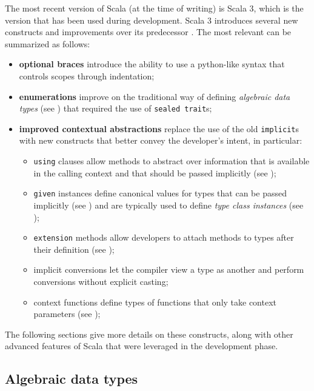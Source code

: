 The most recent version of Scala (at the time of writing) is Scala 3, which is the version that has been used during development.
%
Scala 3 introduces several new constructs and improvements over its predecessor \cite{new-in-scala-3}.
%
The most relevant can be summarized as follows:
%
\begin{itemize}
    \item \textbf{optional braces} introduce the ability to use a python-like syntax that controls scopes through indentation;
    \item \textbf{enumerations} improve on the traditional way of defining \textit{algebraic data types} (see ) that required the use of \texttt{sealed trait}s;
    \item \textbf{improved contextual abstractions} replace the use of the old \texttt{implicit}s with new constructs that better convey the developer's intent, in particular:
    \begin{itemize}
        \item \texttt{using} clauses allow methods to abstract over information that is available in the calling context and that should be passed implicitly (see );
        \item \texttt{given} instances define canonical values for types that can be passed implicitly (see ) and are typically used to define \textit{type class instances} (see );
        \item \texttt{extension} methods allow developers to attach methods to types after their definition (see );
        \item implicit conversions let the compiler view a type as another and perform conversions without explicit casting;
        \item context functions define types of functions that only take context parameters (see );
    \end{itemize}
\end{itemize}

The following sections give more details on these constructs, along with other advanced features of Scala that were leveraged in the development phase.

\subsection{Algebraic data types}
\label{sec:algebraic-data-types}

